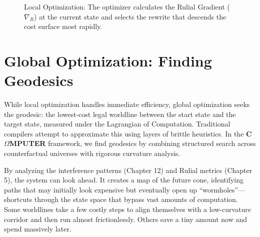 \begin{figure}[h]
\centering
{}
\caption{Local Optimization: The optimizer calculates the Rulial Gradient ($\nabla_{R}$) at the current state and selects the rewrite that descends the cost surface most rapidly.}
\end{figure}

\section{Global Optimization: Finding Geodesics}
\label{global-optimization-finding-geodesics}

While local optimization handles immediate efficiency, global optimization seeks the geodesic: the lowest-cost legal worldline between the start state and the target state, measured under the Lagrangian of Computation. Traditional compilers attempt to approximate this using layers of brittle heuristics. In the \textbf{C$\Omega$MPUTER} framework, we find geodesics by combining structured search across counterfactual universes with rigorous curvature analysis.

By analyzing the interference patterns (Chapter 12) and Rulial metrics (Chapter 5), the system can look ahead. It creates a map of the future cone, identifying paths that may initially look expensive but eventually open up ``wormholes''—shortcuts through the state space that bypass vast amounts of computation. Some worldlines take a few costly steps to align themselves with a low-curvature corridor and then run almost frictionlessly. Others save a tiny amount now and spend massively later.

